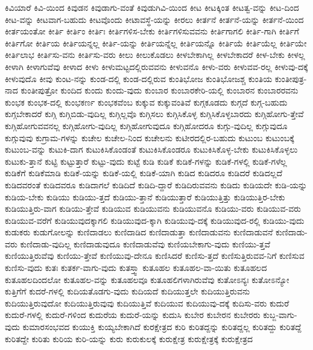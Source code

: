 {ಕಿವಿಯಾರೆ
ಕಿವಿ-ಯಿಂದ
ಕಿವುಡನ
ಕಿವುಡಾಗು-ವಂತೆ
ಕಿವುಡುಗಿವಿ-ಯಿಂದ
ಕೀಟ
ಕೀಟಕ್ಕಿಂತ
ಕೀಟತ್ವ-ವನ್ನು
ಕೀಟ-ದಿಂದ
ಕೀಟ-ವನ್ನು
ಕೀಟವಾಗ-ಬಹುದು
ಕೀಟವೊಂದು
ಕೀಟಾವಸ್ಥೆ-ಯನ್ನು
ಕೀರಲು
ಕೀರ್ತನೆ
ಕೀರ್ತನೆ-ಯನ್ನು
ಕೀರ್ತನೆ-ಯಿಂದ
ಕೀರ್ತಯಂತೋ
ಕೀರ್ತಿ
ಕೀರ್ತಿಂ
ಕೀರ್ತಿಃ
ಕೀರ್ತಿಗಳಿಸ-ಬೇಕು
ಕೀರ್ತಿಗಳಿಸುವವನು
ಕೀರ್ತಿಗಾಗಲಿ
ಕೀರ್ತಿ-ಗಾಗಿ
ಕೀರ್ತಿಗೆ
ಕೀರ್ತಿಗೋ
ಕೀರ್ತಿಯ
ಕೀರ್ತಿಯನ್ನಲ್ಲ
ಕೀರ್ತಿ-ಯನ್ನು
ಕೀರ್ತಿಯನ್ನೆಲ್ಲ
ಕೀರ್ತಿಯನ್ನೊ
ಕೀರ್ತಿಯೆ
ಕೀರ್ತಿಯೆಲ್ಲ
ಕೀರ್ತಿಯೇ
ಕೀರ್ತಿಲಾಭ
ಕೀರ್ತಿಸು-ವನು
ಕೀರ್ತಿಸು-ವರು
ಕೀಲು
ಕೀಲುಕೊಡಲು
ಕೀಳಬೇಕಾಗಿಲ್ಲ
ಕೀಳಬೇಕಾದರೆ
ಕೀಳ-ಬೇಕು
ಕೀಳಲ್ಲ
ಕೀಳಾಗಿ
ಕೀಳಾಗುವೆವು
ಕೀಳಾದ
ಕೀಳು
ಕೀಳುಮಟ್ಟದಲ್ಲಿರುವವನು
ಕೀಳುವನೊ
ಕೀಳು-ವರು
ಕೀಳುವವ-ರಲ್ಲ
ಕೀಳುವು-ದಕ್ಕೆ
ಕೀಳುವುದೊ
ಕೀವು
ಕುಂಟ-ನನ್ನು
ಕುಂಡ-ದಲ್ಲಿ
ಕುಂಡ-ದಲ್ಲಿರುವ
ಕುಂತಿಭೋಜ
ಕುಂತಿಭೋಜಶ್ಚ
ಕುಂತಿಯ
ಕುಂತೀಪುತ್ರ-ನಾದ
ಕುಂತೀಪುತ್ರೋ
ಕುಂದಿದ
ಕುಂದು
ಕುಂದು-ವುದು
ಕುಂಬಾರ
ಕುಂಬಾರಕೇರಿ-ಯಲ್ಲಿ
ಕುಂಬಾರನ
ಕುಂಬಾರರವನು
ಕುಂಭಕ
ಕುಂಭಕ-ದಲ್ಲಿ
ಕುಂಭಕರ್ಣ
ಕುಂಭಕವೆಂಬ
ಕುಕ್ಕುವ
ಕುಕ್ಕುವಂತಿವೆ
ಕುಗ್ಗಕೂಡದು
ಕುಗ್ಗದೆ
ಕುಗ್ಗ-ಬಹುದು
ಕುಗ್ಗಬೇಕಾದರೆ
ಕುಗ್ಗಿ
ಕುಗ್ಗಿಬಿಡು-ವುದಿಲ್ಲ
ಕುಗ್ಗಿಲ್ಲವೊ
ಕುಗ್ಗಿಸಲು
ಕುಗ್ಗಿಸಿಕೊಳ್ಳ
ಕುಗ್ಗಿಸಿಕೊಳ್ಳಬಾರದು
ಕುಗ್ಗಿಹೋಗು-ತ್ತೇವೆ
ಕುಗ್ಗಿಹೋಗುವವನಲ್ಲ
ಕುಗ್ಗಿಹೋಗು-ವುದಿಲ್ಲ
ಕುಗ್ಗಿಹೋಗುವುದೂ
ಕುಗ್ಗಿಹೋದರೂ
ಕುಗ್ಗು-ವುದಿಲ್ಲ
ಕುಗ್ಗುವುದೂ
ಕುಗ್ಗುವುವು
ಕುಗ್ರಾಮ-ಗಳನ್ನು
ಕುಚೇಲ
ಕುಚೇಲ-ನಿಂದ
ಕುಚೇಲನು
ಕುಟೀರದಲ್ಲಿರ-ಬಹುದು
ಕುಟುಂಬ
ಕುಟುಂಬಕ್ಕೆ
ಕುಟುಂಬ-ವನ್ನು
ಕುಟುಕಿ-ದಾಗ
ಕುಟುಕಿಸಿಕೊಂಡಂತೆ
ಕುಟುಕಿಸಿಕೊಂಡರೂ
ಕುಟುಕಿಸಿಕೊಳ್ಳ-ಬೇಕು
ಕುಟುಕಿಸಿಕೊಳ್ಳಲು
ಕುಟುಕು-ತ್ತಾನೆ
ಕುಟ್ಟಿ
ಕುಟ್ಟುತ್ತಾರೆ
ಕುಟ್ಟು-ವುದು
ಕುಟ್ಟೆ
ಕುಡಿ
ಕುಡಿಕೆ
ಕುಡಿಕೆ-ಗಳನ್ನು
ಕುಡಿಕೆ-ಗಳಲ್ಲಿ
ಕುಡಿಕೆ-ಗಳೆಲ್ಲ
ಕುಡಿಕೆಗೆ
ಕುಡಿಕೆಮಾಡಿ
ಕುಡಿಕೆ-ಯನ್ನು
ಕುಡಿಕೆ-ಯಲ್ಲಿ
ಕುಡಿಕೆ-ಯಾಗಿ
ಕುಡಿದ
ಕುಡಿದರೂ
ಕುಡಿದರೆ
ಕುಡಿದಲ್ಲದೆ
ಕುಡಿದವರಂತೆ
ಕುಡಿದವರೂ
ಕುಡಿದಾಗಲೆ
ಕುಡಿದಿದೆ
ಕುಡಿದಿ-ದ್ದಾರೆ
ಕುಡಿದಿರುವವನು
ಕುಡಿದು
ಕುಡಿಯದೇ
ಕುಡಿ-ಯನ್ನು
ಕುಡಿಯ-ಬೇಕು
ಕುಡಿಯು
ಕುಡಿಯು-ತ್ತದೆ
ಕುಡಿಯು-ತ್ತಾನೆ
ಕುಡಿಯುತ್ತಾರೆ
ಕುಡಿಯುತ್ತಿತ್ತು
ಕುಡಿಯುತ್ತಿರ-ಬೇಕು
ಕುಡಿಯುತ್ತಿರು-ವಾಗ
ಕುಡಿಯು-ತ್ತೇವೆ
ಕುಡಿಯುವ
ಕುಡಿಯುವನು
ಕುಡಿಯುವನೊ
ಕುಡಿಯು-ವರು
ಕುಡಿಯುವ-ವರು
ಕುಡಿಯುವ-ವರೆಗೆ
ಕುಡಿಯುವುದಕ್ಕಾಗಲಿ
ಕುಡಿಯುವುದ-ಕ್ಕಾಗಿ
ಕುಡಿಯುವು-ದಕ್ಕೆ
ಕುಡಿಯುವುದ-ರಲ್ಲಿ
ಕುಡಿಯು-ವುದು
ಕುಡುಕರು
ಕುಡುಗೋಲನ್ನು
ಕುಣಿದಾಡಲು
ಕುಣಿದಾಡಿದ
ಕುಣಿದಾಡುತ್ತಾ
ಕುಣಿದಾಡುವನು
ಕುಣಿದಾಡುವನೆ
ಕುಣಿದಾಡು-ವರು
ಕುಣಿದಾಡು-ವುದಿಲ್ಲ
ಕುಣಿದಾಡುವುದೂ
ಕುಣಿದಾಡುವೆವು
ಕುಣಿಯಬೇಕಾಗು-ವುದು
ಕುಣಿಯು-ತ್ತವೆ
ಕುಣಿಯುತ್ತಿರುವೆವು
ಕುಣಿಯು-ತ್ತೇವೆ
ಕುಣಿಯುವು-ದೇನೂ
ಕುಣಿಸಿದರೆ
ಕುಣಿಸು-ತ್ತದೆ
ಕುಣಿಸುತ್ತಿರುವವ-ನಿಗೆ
ಕುಣಿಸುವ
ಕುಣಿಸು-ವುದು
ಕುತಃ
ಕುತರ್ಕ-ವಾಗು-ವುದು
ಕುತಸ್ತ್ವಾ
ಕುತೂಹಲ
ಕುತೂಹಲ-ವಾ-ಯಿತು
ಕುತೂಹಲದ
ಕುತೂಹಲದಿಂದಲೋ
ಕುತೂಹಲ-ವನ್ನು
ಕುತೂಹಲವೂ
ಕುತೂಹಲಿಗಳಾಗಿರುವೆವು
ಕುತೋಽನ್ಯಃ
ಕುತೋಽನ್ಯೋ
ಕುತ್ತಿಗೆಗೆ
ಕುದರೆ-ಗಳಲ್ಲಿ
ಕುದಿಯತೊಡಗು-ವುದು
ಕುದಿಯದೆ
ಕುದಿಯುತ್ತಲೇ
ಕುದಿಯುತ್ತಿರುವನು
ಕುದಿಯುತ್ತಿರುವುದೋ
ಕುದಿಯುತ್ತಿರುವುವು
ಕುದಿಯುತ್ತಿವೆ
ಕುದಿಯುವ
ಕುದಿಯುವು-ದಕ್ಕೆ
ಕುದಿಸು-ವರು
ಕುದುರೆ
ಕುದುರೆ-ಗಳಲ್ಲಿ
ಕುದುರೆ-ಗಳಿಂದ
ಕುದುರೆಯ
ಕುದುರೆ-ಯನ್ನು
ಕುದುಸಿ
ಕುಬೇರ
ಕುಬೇರನ
ಕುಬೇರರು
ಕುಬ್ಜ-ವಾಗು-ವುದು
ಕುಮಾರಸಂಭವದ
ಕುಯುಕ್ತಿ
ಕುಯ್ಯಬೇಕಾಗಿದೆ
ಕುರಕ್ಷೇತ್ರದ
ಕುರಿ
ಕುರಿತದ್ದನ್ನು
ಕುರಿತದ್ದಲ್ಲ
ಕುರಿತದ್ದು
ಕುರಿತದ್ದೆ
ಕುರಿತದ್ದೇ
ಕುರಿತು
ಕುರಿಯ
ಕುರಿ-ಯನ್ನು
ಕುರು
ಕುರುಕುಲಕ್ಕೆ
ಕುರುಕ್ಷೇತ್ರ
ಕುರುಕ್ಷೇತ್ರಕ್ಕೆ
ಕುರುಕ್ಷೇತ್ರದ
}
